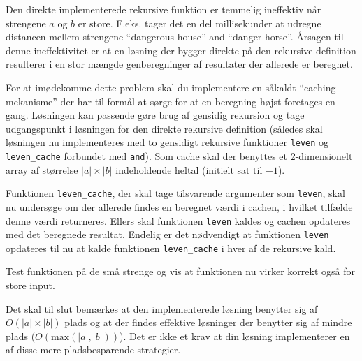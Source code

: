 Den direkte implementerede rekursive funktion er temmelig
    ineffektiv når strengene $a$ og $b$ er store. F.eks. tager det en
    del millisekunder at udregne distancen mellem strengene
    ``dangerous house'' and ``danger horse''. Årsagen til denne
    ineffektivitet er at en løsning der bygger direkte på den
    rekursive definition resulterer i en stor mængde genberegninger af
    resultater der allerede er beregnet.

    For at imødekomme dette problem skal du implementere en såkaldt
    ``caching mekanisme'' der har til formål at sørge for at en
    beregning højst foretages en gang.  Løsningen kan passende gøre
    brug af gensidig rekursion og tage udgangspunkt i løsningen for
    den direkte rekursive definition (således skal løsningen nu
    implementeres med to gensidigt rekursive funktioner \lstinline{leven} og \lstinline{leven_cache} forbundet med
    \lstinline{and}). Som cache skal der benyttes et 2-dimensionelt
    array af størrelse $|a|\times|b|$ indeholdende heltal (initielt
    sat til $-1$).

    Funktionen \lstinline{leven_cache}, der skal tage tilsvarende
    argumenter som \lstinline{leven}, skal nu undersøge om der
    allerede findes en beregnet værdi i cachen, i hvilket tilfælde
    denne værdi returneres. Ellers skal funktionen \lstinline{leven}
    kaldes og cachen opdateres med det beregnede resultat. Endelig er
    det nødvendigt at funktionen \lstinline{leven} opdateres til nu at
    kalde funktionen \lstinline{leven_cache} i hver af de rekursive kald.

    Test funktionen på de små strenge og vis at funktionen nu virker
    korrekt også for store input.

    Det skal til slut bemærkes at den implementerede løsning benytter
    sig af $O(|a| \times |b|)$ plads og at der findes effektive
    løsninger der benytter sig af mindre plads
    ($O(\mathrm{max}(|a|,|b|))$). Det er ikke et krav at din løsning
    implementerer en af disse mere pladsbesparende strategier.